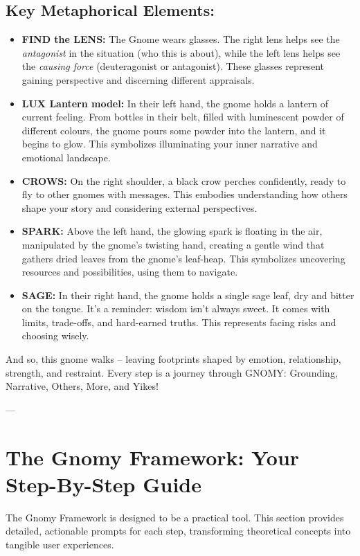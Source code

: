 \documentclass{article}
\begin{document}
\subsection*{Key Metaphorical Elements:}
\begin{itemize}[noitemsep,topsep=0pt]
    \item \textbf{FIND the LENS:} The Gnome wears glasses. The right lens helps see the \textit{antagonist} in the situation (who this is about), while the left lens helps see the \textit{causing force} (deuteragonist or antagonist). These glasses represent gaining perspective and discerning different appraisals.
    \item \textbf{LUX Lantern model:} In their left hand, the gnome holds a lantern of current feeling. From bottles in their belt, filled with luminescent powder of different colours, the gnome pours some powder into the lantern, and it begins to glow. This symbolizes illuminating your inner narrative and emotional landscape.
    \item \textbf{CROWS:} On the right shoulder, a black crow perches confidently, ready to fly to other gnomes with messages. This embodies understanding how others shape your story and considering external perspectives.
    \item \textbf{SPARK:} Above the left hand, the glowing spark is floating in the air, manipulated by the gnome's twisting hand, creating a gentle wind that gathers dried leaves from the gnome's leaf-heap. This symbolizes uncovering resources and possibilities, using them to navigate.
    \item \textbf{SAGE:} In their right hand, the gnome holds a single sage leaf, dry and bitter on the tongue. It's a reminder: wisdom isn't always sweet. It comes with limits, trade-offs, and hard-earned truths. This represents facing risks and choosing wisely.
\end{itemize}
And so, this gnome walks -- leaving footprints shaped by emotion, relationship, strength, and restraint. Every step is a journey through GNOMY: Grounding, Narrative, Others, More, and Yikes!

---

\section{The Gnomy Framework: Your Step-By-Step Guide}
The Gnomy Framework is designed to be a practical tool. This section provides detailed, actionable prompts for each step, transforming theoretical concepts into tangible user experiences.
\end{document}
